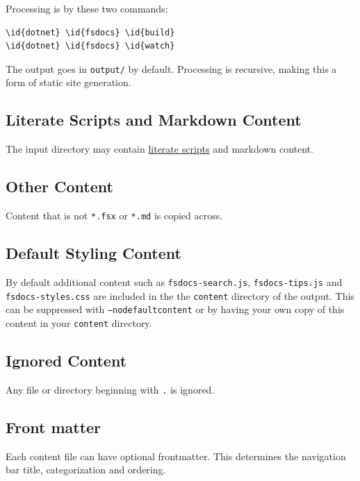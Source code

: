 \documentclass{article}
\newcommand{\id}[1]{\textcolor{black}{#1}}
\begin{document}
Processing is by these two commands:
\begin{Verbatim}[commandchars=\\\{\}]
\id{dotnet} \id{fsdocs} \id{build}
\id{dotnet} \id{fsdocs} \id{watch}

\end{Verbatim}



The output goes in \texttt{output/} by default.  Processing is recursive, making this a form of static site generation.
\subsection*{Literate Scripts and Markdown Content}



The input directory may contain \href{literate.html}{literate scripts} and markdown content.
\subsection*{Other Content}



Content that is not \texttt{*.fsx} or \texttt{*.md} is copied across.
\subsection*{Default Styling Content}



By default additional content such as \texttt{fsdocs-search.js}, \texttt{fsdocs-tips.js} and \texttt{fsdocs-styles.css} are included in the
the \texttt{content} directory of the output.  This can be suppressed with \texttt{--nodefaultcontent} or by having your own
copy of this content in your \texttt{content} directory.
\subsection*{Ignored Content}



Any file or directory beginning with \texttt{.} is ignored.
\subsection*{Front matter}



Each content file can have optional frontmatter.  This determines the navigation bar title, categorization and ordering.
\end{document}
